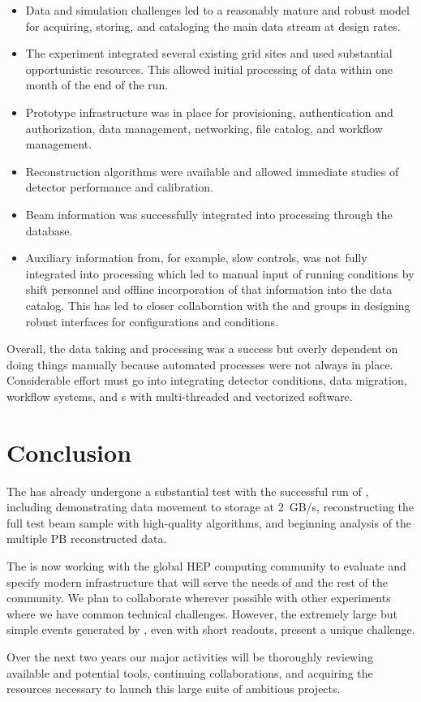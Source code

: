 \begin{itemize}
    \item Data and simulation challenges led to a reasonably mature and robust model for acquiring, storing, and cataloging the main data stream at design rates.
    \item The experiment integrated several existing grid sites and used substantial opportunistic resources.  This allowed initial processing of data within one month of the end of the run.
    \item Prototype infrastructure was in place for provisioning, authentication and authorization, data management, networking, file catalog, and workflow management. 
    \item Reconstruction algorithms were available and allowed immediate studies of detector performance and calibration. 
    \item Beam information was successfully integrated into processing through the  database.
    \item Auxiliary information from, for example, slow controls, was not fully integrated into processing which led to  manual input of running conditions by shift personnel and offline incorporation of that information into the data catalog. This has led to closer collaboration with the  and  groups in designing robust interfaces for configurations and conditions. 
\end{itemize}

Overall, the  data taking and processing was a success but overly dependent on doing things manually because automated processes were not always in place. Considerable effort must go into integrating detector conditions, data migration, workflow systems, and s with multi-threaded and vectorized software.





\section{Conclusion}

The   has already undergone a substantial test with the successful run of , including demonstrating data movement to storage at \SI{2}{GB/s}, reconstructing the full test beam sample with high-quality algorithms, and beginning analysis of the multiple PB reconstructed data. 

The  is now working with the global HEP computing community to evaluate and specify modern infrastructure that will serve the needs of  and the rest of the community.  We plan to collaborate wherever possible with other experiments where we have common technical challenges. However, the extremely large but simple events generated by  , even with short readouts, present a unique challenge. 

Over the next two years our major activities  will be  thoroughly reviewing available and potential tools, continuing collaborations, and acquiring the resources necessary to launch this large suite of ambitious projects. 

